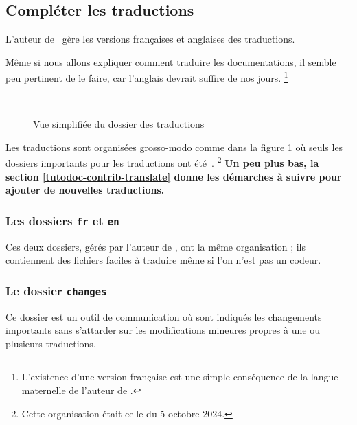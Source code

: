 \documentclass{../main/main}
\begin{document}

\subsection{Compléter les traductions}

\begin{tdocnote}
    L'auteur de \thisproj\ gère les versions françaises et anglaises des traductions.
\end{tdocnote}


\begin{tdocimp}
    Même si nous allons expliquer comment traduire les documentations, il semble peu pertinent de le faire, car l'anglais devrait suffire de nos jours.%
    \footnote{
        L'existence d'une version française est une simple conséquence de la langue maternelle de l'auteur de \thisproj.
    }
\end{tdocimp}

\begin{figure}[ht]
    \centering
    \contribtranslatedirtree\
    \caption{Vue simplifiée du dossier des traductions}
    \label{tutodoc-contrib-translate-dir}
\end{figure}


Les traductions sont organisées grosso-modo comme dans la figure \ref{tutodoc-contrib-translate-dir} où seuls les dossiers importants pour les traductions ont été \,.%
\footnote{
    Cette organisation était celle du 5 octobre 2024.
}
\textbf{Un peu plus bas, la section \ref{tutodoc-contrib-translate} donne les démarches à suivre pour ajouter de nouvelles traductions.}


\subsubsection{Les dossiers \texttt{fr} et \texttt{en}}

Ces deux dossiers, gérés par l'auteur de \thisproj, ont la même organisation ; ils contiennent des fichiers faciles à traduire même si l'on n'est pas un codeur.


\subsubsection{Le dossier \texttt{changes}}

Ce dossier est un outil de communication où sont indiqués les changements importants sans s'attarder sur les modifications mineures propres à une ou plusieurs traductions.
\end{document}
